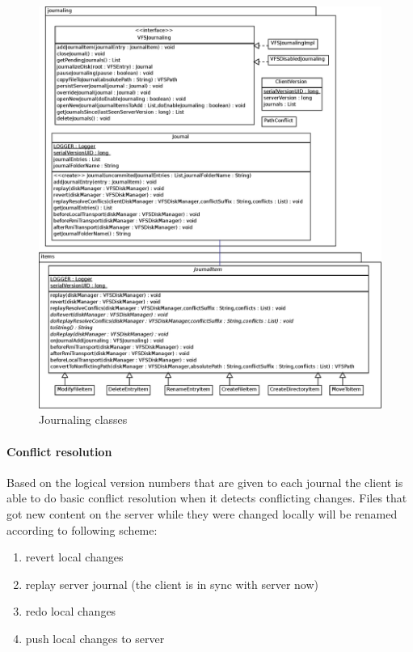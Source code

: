 \begin{figure}[h!]
\centering
\includegraphics[width=1\textwidth]{figures/22Journaling.eps}
\caption{Journaling classes}
\label{fig:journaling_classes}
\end{figure}

\paragraph{Conflict resolution}
Based on the logical version numbers that are given to each journal the client
is able to do basic conflict resolution when it detects conflicting changes.
Files that got new content on the server while they were changed locally will be
renamed according to following scheme:

\begin{enumerate}
    \item revert local changes
  \item replay server journal (the client is in sync with server now)
  \item redo local changes
  \item push local changes to server
\end{enumerate}
